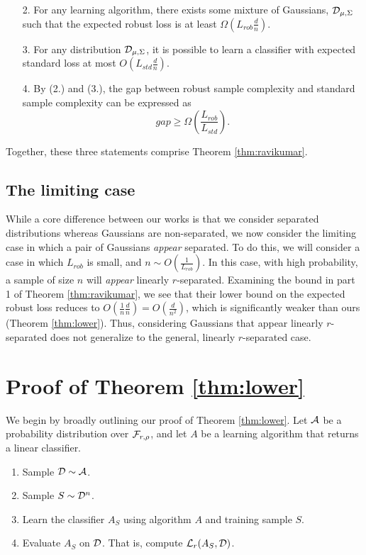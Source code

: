 \begin{enumerate}
	\item[2.] For any learning algorithm, there exists some mixture of Gaussians, ${\mathcal D}_{\mu, \Sigma}$ such that the expected robust loss is at least $\Omega(L_{rob}\frac{d}{n}).$
	\item[3.] For any distribution ${\mathcal D}_{\mu, \Sigma}$, it is possible to learn a classifier with expected standard loss at most $O(L_{std}\frac{d}{n})$.
	\item[4.] By (2.) and (3.), the gap between robust sample complexity and standard sample complexity can be expressed as $$gap \geq \Omega(\frac{L_{rob}}{L_{std}}).$$
\end{enumerate}

Together, these three statements comprise Theorem \ref{thm:ravikumar}. 

\subsection{The limiting case}

While a core difference between our works is that we consider separated distributions whereas Gaussians are non-separated, we now consider the limiting case in which a pair of Gaussians \textit{appear} separated. To do this, we will consider a case in which $L_{rob}$ is small, and $n \sim O(\frac{1}{L_{rob}})$. In this case, with high probability, a sample of size $n$ will \textit{appear} linearly $r$-separated. Examining the bound in part 1 of Theorem \ref{thm:ravikumar}, we see that their lower bound on the expected robust loss reduces to $O(\frac{1}{n}\frac{d}{n}) = O(\frac{d}{n^2})$, which is significantly weaker than ours (Theorem \ref{thm:lower}). Thus, considering Gaussians that appear linearly $r$-separated does not generalize to the general, linearly $r$-separated case. 

\section{Proof of Theorem \ref{thm:lower}}

We begin by broadly outlining our proof of Theorem \ref{thm:lower}. Let $\mathcal{A}$ be a probability distribution over ${\mathcal F}_{r, \rho}$, and let $A$ be a learning algorithm that returns a linear classifier.

\begin{enumerate}
	\item Sample ${\mathcal D} \sim \mathcal{A}$.
	\item Sample $S \sim {\mathcal D}^n$.
	\item Learn the classifier $A_S$ using algorithm $A$ and training sample $S$.
	\item Evaluate $A_S$ on ${\mathcal D}$. That is, compute $\mathcal L_r(A_S, {\mathcal D})$. 
\end{enumerate}

